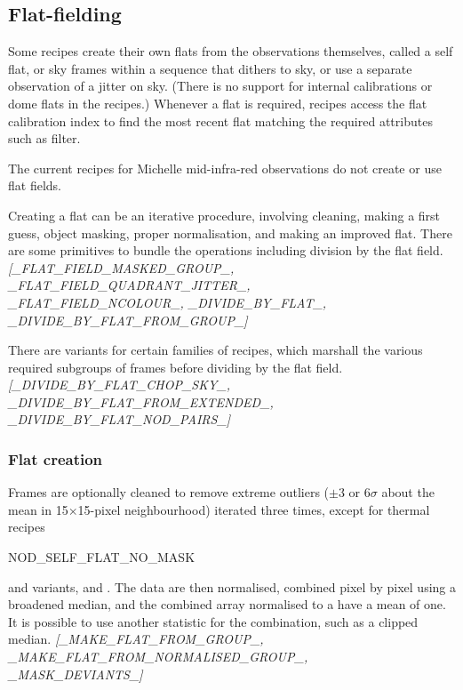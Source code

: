 \documentclass[twoside,11pt,nolof]{starlink}
\begin{document}
\subsection{Flat-fielding\label{flat-fielding}}

Some recipes create their own flats from the observations themselves,
called a self flat, or sky frames within a sequence that dithers to
sky, or use a separate observation of a jitter on sky.  (There is no
support for internal calibrations or dome flats in the recipes.)
Whenever a flat is required, recipes access the flat calibration index
to find the most recent flat matching the required attributes such as
filter.

The current recipes for Michelle mid-infra-red observations do not
create or use flat fields.

Creating a flat can be an iterative procedure, involving cleaning,
making a first guess, object masking, proper normalisation, and making
an improved flat.  There are some primitives to bundle the operations
including division by the flat field.
\newline \emph{[\_FLAT\_FIELD\_MASKED\_GROUP\_, \_FLAT\_FIELD\_QUADRANT\_JITTER\_,\\
\_FLAT\_FIELD\_NCOLOUR\_,  \_DIVIDE\_BY\_FLAT\_,
\_DIVIDE\_BY\_FLAT\_FROM\_GROUP\_]}

There are variants for certain families of recipes, which marshall the
various required subgroups of frames before dividing by the flat field.
\newline \emph{[\_DIVIDE\_BY\_FLAT\_CHOP\_SKY\_, \_DIVIDE\_BY\_FLAT\_FROM\_EXTENDED\_,\\
\_DIVIDE\_BY\_FLAT\_NOD\_PAIRS\_]}

\subsubsection{Flat creation\label{flat_creation}}

Frames are optionally cleaned to remove extreme outliers ($\pm$3 or
6$\sigma$ about the mean in 15$\times$15-pixel neighbourhood) iterated
three times, except for thermal recipes
\begin{latexonly}
NOD\_SELF\_FLAT\_NO\_\-MASK
\end{latexonly}


and variants, and .
The data are then normalised, combined pixel by pixel using a broadened median,
and the combined array normalised to a have a mean of one.  It is possible to
use another statistic for the combination, such as a clipped median.
\newline \emph{[\_MAKE\_FLAT\_FROM\_GROUP\_,
\_MAKE\_FLAT\_FROM\_NORMALISED\_GROUP\_,\\
\_MASK\_DEVIANTS\_]}
\end{document}
